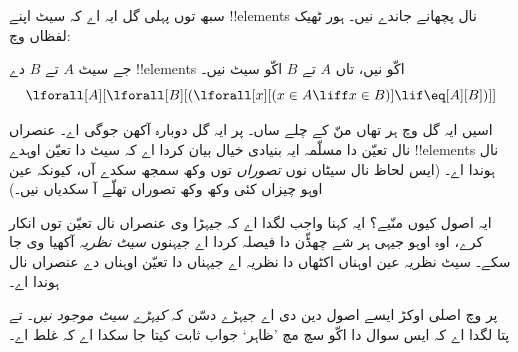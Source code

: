 \documentclass[../../../include/open-logic-section]{subfiles}
\begin{document}

سبھ توں پہلی گل ایہ اے کہ سیٹ اپنے !!{element}s نال پچھانے جاندے نیں۔
ہور ٹھیک لفظاں وچ:

\begin{axiom}
جے سیٹ $A$ تے $B$ دے !!{element}s اکّو نیں، تاں $A$ تے $B$ اکّو سیٹ نیں۔
\[
  \lforall[A][\lforall[B][(\lforall[x][(x \in A \liff x \in B)] \lif
  \eq[A][B])]]
\]
\end{axiom}

اسیں ایہ گل  وچ ہر تھاں منّ کے چلے ساں۔ پر ایہ گل
دوبارہ آکھن جوگی اے۔ عنصراں نال تعیّن دا مسلّمہ ایہ بنیادی خیال بیان کردا اے
کہ سیٹ دا تعیّن اوہدے !!{element}s نال ہوندا اے۔ (ایس لحاظ نال سیٹاں نوں
\emph{تصوراں} توں وکھ سمجھ سکدے آں، کیونکہ عین اوہو چیزاں کئی وکھ وکھ
تصوراں تھلّے آ سکدیاں نیں۔)

ایہ اصول کیوں منّیے؟ ایہ کہنا واجب لگدا اے کہ جیہڑا وی عنصراں نال
تعیّن توں انکار کرے، اوہ اوہو جیہی ہر شے چھڈّن دا فیصلہ کردا اے جیہنوں
\emph{سیٹ نظریہ} آکھیا وی جا سکے۔ سیٹ نظریہ عین اوہناں اکٹھاں دا نظریہ اے
جیہناں دا تعیّن اوہناں دے عنصراں نال ہوندا اے۔

پر  وچ اصلی اوکڑ ایسے اصول دین دی اے جیہڑے دسّن کہ
\emph{کیہڑے سیٹ موجود نیں}۔ تے پتا لگدا اے کہ ایس سوال دا اکّو سچ مچ
’ظاہر‘ جواب ثابت کیتا جا سکدا اے کہ غلط اے۔
\end{document}
